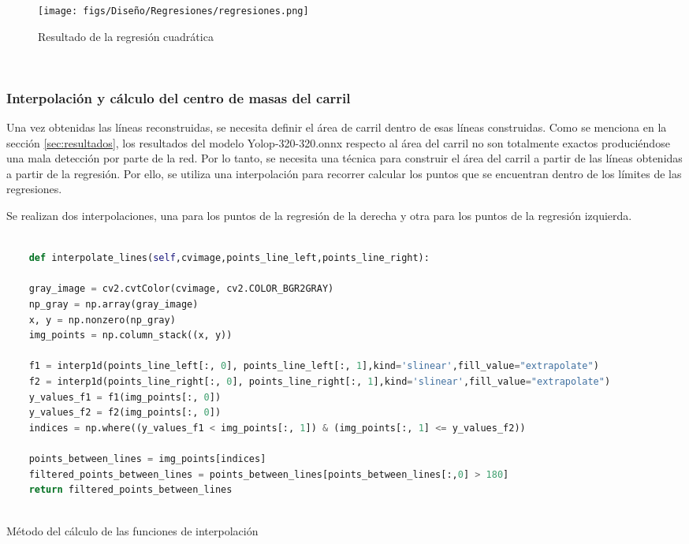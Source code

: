 \begin{figure} [H]
  \begin{center}
    \texttt{[image: figs/Diseño/Regresiones/regresiones.png]}
  \end{center}
  \caption{Resultado de la regresión cuadrática}
  \label{fig:regresión cuadrática}
\end{figure}\

\subsubsection{Interpolación y cálculo del centro de masas del carril}
\label{sec:Interpolación y cálculo del centro de masas del carril}

Una vez obtenidas las líneas reconstruidas, se necesita definir el área de carril dentro de esas líneas construidas. Como se menciona en la sección 
\ref{sec:resultados}, los resultados del modelo Yolop-320-320.onnx respecto al área del carril no son totalmente exactos produciéndose una mala detección por parte de la red. Por lo tanto, se necesita
una técnica para construir el área del carril a partir de las líneas obtenidas a partir de la regresión. Por ello, se utiliza una interpolación para recorrer calcular los puntos que se encuentran
dentro de los límites de las regresiones. \newline



Se realizan dos interpolaciones, una para 
los puntos de la regresión de la  derecha
y otra para los puntos de la regresión izquierda. 


\begin{code}[h]
  \begin{lstlisting}[language=Python]

    def interpolate_lines(self,cvimage,points_line_left,points_line_right):

    gray_image = cv2.cvtColor(cvimage, cv2.COLOR_BGR2GRAY) 
    np_gray = np.array(gray_image)
    x, y = np.nonzero(np_gray)
    img_points = np.column_stack((x, y))

    f1 = interp1d(points_line_left[:, 0], points_line_left[:, 1],kind='slinear',fill_value="extrapolate")
    f2 = interp1d(points_line_right[:, 0], points_line_right[:, 1],kind='slinear',fill_value="extrapolate") 
    y_values_f1 = f1(img_points[:, 0])
    y_values_f2 = f2(img_points[:, 0])
    indices = np.where((y_values_f1 < img_points[:, 1]) & (img_points[:, 1] <= y_values_f2))
    
    points_between_lines = img_points[indices]
    filtered_points_between_lines = points_between_lines[points_between_lines[:,0] > 180]
    return filtered_points_between_lines
    
  \end{lstlisting}
  \caption[Método de interpolación]{Método del cálculo de las funciones de interpolación}
  \label{cod:interpolación}
  \end{code}  

